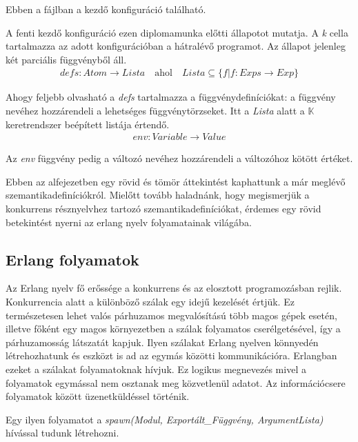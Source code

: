 Ebben a fájlban a kezdő konfiguráció található.



A fenti kezdő konfiguráció ezen diplomamunka előtti állapotot mutatja. A \textit{k} cella tartalmazza az adott konfigurációban a hátralévő programot. Az állapot jelenleg két parciális függvényből áll. 
\begin{align*}
defs: Atom \rightarrow Lista \quad \textrm{ahol} \quad Lista \subseteq \{f | f : Exps \rightarrow Exp\}
\end{align*}

Ahogy feljebb olvasható a \textit{defs} tartalmazza a függvénydefiníciókat: a függvény nevéhez hozzárendeli a lehetséges függvénytörzseket. Itt a \textit{Lista} alatt a $\mathbb{K}$ keretrendszer beépített listája értendő.
\begin{align*}
env: Variable \rightarrow Value
\end{align*}

Az \textit{env} függvény pedig a változó nevéhez hozzárendeli a változóhoz kötött értéket.

Ebben az alfejezetben egy rövid és tömör áttekintést kaphattunk a már meglévő szemantikadefiníciókról. Mielőtt tovább haladnánk, hogy megismerjük a konkurrens résznyelvhez tartozó szemantikadefiníciókat, érdemes egy rövid betekintést nyerni az erlang nyelv folyamatainak világába.

\subsection{Erlang folyamatok}
Az Erlang nyelv fő erőssége a konkurrens és az elosztott programozásban rejlik. Konkurrencia alatt a különböző szálak egy idejű kezelését értjük. Ez természetesen lehet valós párhuzamos megvalósítású több magos gépek esetén, illetve főként egy magos környezetben a szálak folyamatos cserélgetésével, így a párhuzamosság látszatát kapjuk. Ilyen szálakat Erlang nyelven könnyedén létrehozhatunk és eszközt is ad az egymás közötti kommunikációra. Erlangban ezeket a szálakat folyamatoknak hívjuk. Ez logikus megnevezés mivel a folyamatok egymással nem osztanak meg közvetlenül adatot. Az információcsere folyamatok között üzenetküldéssel történik.

Egy ilyen folyamatot a \textit{spawn(Modul, Exportált\_Függvény, ArgumentLista)} hívással tudunk létrehozni.



